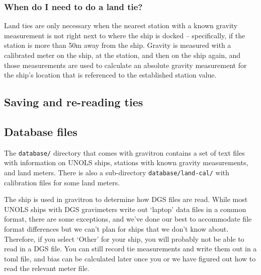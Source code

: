 \documentclass{pfpe-manual}
\begin{document}
\subsubsection{When do I need to do a land tie?}
Land ties are only necessary when the nearest station with a known gravity measurement is not right next to where the ship is docked -- specifically, if the station is more than 50m away from the ship. Gravity is measured with a calibrated meter on the ship, at the station, and then on the ship again, and those measurements are used to calculate an absolute gravity measurement for the ship's location that is referenced to the established station value.

\subsection{Saving and re-reading ties}
\label{save-re}
%
%

\subsection{Database files}
\label{datab}
The \texttt{database/} directory that comes with gravitron contains a set of text files with information on UNOLS ships, stations with known gravity measurements, and land meters. There is also a sub-directory \texttt{database/land-cal/} with calibration files for some land meters.

The ship is used in gravitron to determine how DGS files are read. While most UNOLS ships with DGS gravimeters write out `laptop' data files in a common format, there are some exceptions, and we've done our best to accommodate file format differences but we can't plan for ships that we don't know about. Therefore, if you select `Other' for your ship, you will probably not be able to read in a DGS file. You can still record tie measurements and write them out in a toml file, and bias can be calculated later once you or we have figured out how to read the relevant meter file.
\end{document}
